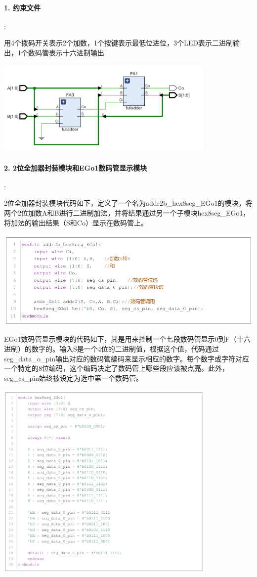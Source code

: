 \documentclass[a4,10pt,zihao=-4]{ctexart}
\begin{document}
\paragraph{1. 约束文件}:

用4个拨码开关表示2个加数，1个按键表示最低位进位，3个LED表示二进制输出，1个数码管表示十六进制输出
  
\includegraphics[width=0.8\textwidth]{2bitadder_RTL.png}

  
\paragraph{2. 2位全加器封装模块和EGo1数码管显示模块}:


2位全加器封装模块代码如下，定义了一个名为addr2b\_hex8seg\_EGo1的模块，将两个2位加数A和B进行二进制加法，并将结果通过另一个子模块hex8seg\_EGo1，将加法的输出结果（S和Co）显示在数码管上。

\includegraphics[width=1\textwidth]{2位全加器封装模块.png}
 

EGo1数码管显示模块的代码如下，其是用来控制一个七段数码管显示0到F（十六进制）的数字的。输入S是一个4位的二进制值，根据这个值，代码通过seg\_data\_o\_pin输出对应的数码管编码来显示相应的数字。每个数字或字符对应一个特定的8位编码，这个编码决定了数码管上哪些段应该被点亮。此外，seg\_cs\_pin始终被设定为选中第一个数码管。

\includegraphics[width=0.8\textwidth]{EGo1数码管显示模块.png}
\end{document}
